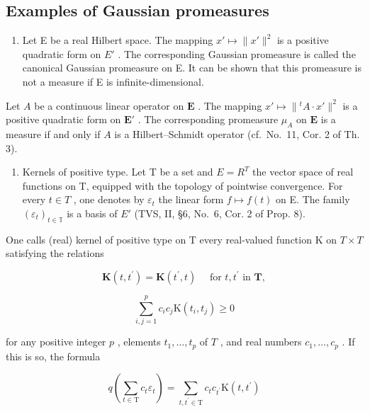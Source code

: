 \subsection{Examples of Gaussian promeasures}

\begin{enumerate}
\def\labelenumi{\arabic{enumi})}
\tightlist
\item
  Let E be a real Hilbert space. The mapping \(x' \mapsto \|x'\|^2\) is a positive quadratic form on \(E'\) . The corresponding Gaussian promeasure is called the canonical Gaussian promeasure on E. It can be shown that this promeasure is not a measure if E is infinite-dimensional.
\end{enumerate}

Let \(A\) be a continuous linear operator on \(\mathbf{E}\) . The mapping \(x' \mapsto \|{}^{t} A \cdot x'\|^2\) is a positive quadratic form on \(\mathbf{E}'\) . The corresponding promeasure \(\mu_A\) on \(\mathbf{E}\) is a measure if and only if \(A\) is a Hilbert--Schmidt operator (cf.~No.~11, Cor. 2 of Th. 3).

\begin{enumerate}
\def\labelenumi{\arabic{enumi})}
\setcounter{enumi}{1}
\tightlist
\item
  Kernels of positive type. Let T be a set and \(E = R^{T}\) the vector space of real functions on T, equipped with the topology of pointwise convergence. For every \(t \in T\) , one denotes by \(\varepsilon_{t}\) the linear form \(f \mapsto f(t)\) on E. The family \((\varepsilon_{t})_{t \in \mathbb{T}}\) is a basis of \(E'\) (TVS, II, §6, No.~6, Cor. 2 of Prop. 8).
\end{enumerate}

One calls (real) kernel of positive type on T every real-valued function K on \(T \times T\) satisfying the relations

\[
\mathbf {K} (t, t ^ {\prime}) = \mathbf {K} (t ^ {\prime}, t) \quad \text { for } t, t ^ {\prime} \text { in } \mathbf {T},\tag{20}
\]

\[
\sum_ {i, j = 1} ^ {p} c _ {i} c _ {j} \mathrm{K} (t _ {i}, t _ {j}) \geqslant 0\tag{21}
\]

for any positive integer \(p\) , elements \(t_1, \ldots, t_p\) of \(T\) , and real numbers \(c_1, \ldots, c_p\) . If this is so, the formula

\[
q \left(\sum_ {t \in \mathrm{T}} c _ {t} \varepsilon_ {t}\right) = \sum_ {t, t ^ {\prime} \in \mathrm{T}} c _ {t} c _ {t ^ {\prime}} \mathrm{K} (t, t ^ {\prime})\tag{22}
\]

